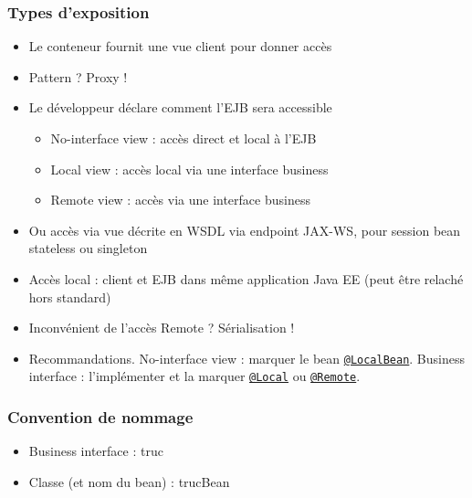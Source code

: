 \documentclass[english, french]{beamer}
\begin{document}
\begin{frame}
	\frametitle{Types d’exposition}
	\begin{itemize}
		\item Le conteneur fournit une vue client pour donner accès
		\item Pattern ? \pause Proxy ! \pause
		\item Le développeur déclare comment l’EJB sera accessible
		\begin{itemize}
			\item No-interface view : accès direct et local à l’EJB
			\item Local view : accès local via une interface \og{}business\fg{}
			\item Remote view : accès via une interface \og{}business\fg{}
		\end{itemize}
		\item {\tiny Ou accès via vue décrite en WSDL via endpoint JAX-WS, pour session bean stateless ou singleton}
		\item Accès local : client et EJB dans même application Java EE {\tiny (peut être relaché hors standard)}
		\item Inconvénient de l’accès Remote ? \pause Sérialisation !\pause
		\item Recommandations. No-interface view : marquer le bean \href{http://docs.oracle.com/javaee/7/api/javax/ejb/LocalBean.html}{\texttt{@LocalBean}}. Business interface : l’implémenter et la marquer \href{http://docs.oracle.com/javaee/7/api/javax/ejb/Local.html}{\texttt{@Local}} ou \href{http://docs.oracle.com/javaee/7/api/javax/ejb/Remote.html}{\texttt{@Remote}}.
	\end{itemize}
\end{frame}

\begin{frame}
	\frametitle{Convention de nommage}
	\begin{itemize}
		\item Business interface : truc
		\item Classe (et nom du bean) : trucBean
	\end{itemize}
\end{frame}
\end{document}
